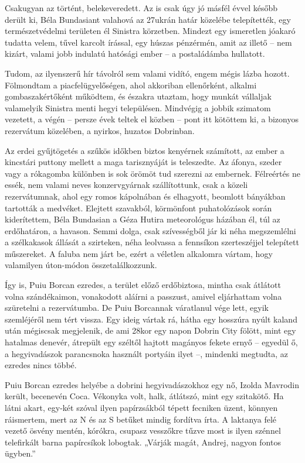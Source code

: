 \documentclass{IEEEtran}
\begin{document}
Csakugyan az történt, belekeveredett. Az is csak úgy jó másfél évvel később
derült ki, Béla Bundasiant valahová az 27ukrán határ közelébe telepítették,
egy természetvédelmi területen él Sinistra körzetben. Mindezt egy ismeretlen
jóakaró tudatta velem, tűvel karcolt írással, egy húszas pénzérmén, amit az
illető – nem kizárt, valami jobb indulatú hatósági ember – a postaládámba
hullatott.

Tudom, az ilyenszerű hír távolról sem valami vidító, engem mégis lázba hozott.
Fölmondtam a piacfelügyelőségen, ahol akkoriban ellenőrként, alkalmi
gombaszakértőként működtem, és északra utaztam, hogy munkát vállaljak
valamelyik Sinistra menti hegyi településen. Mindvégig a jobbik szimatom
vezetett, a végén – persze évek teltek el közben – pont itt kötöttem ki, a
bizonyos rezervátum közelében, a nyirkos, huzatos Dobrinban.

Az erdei gyűjtögetés a szűkös időkben biztos kenyérnek számított, az ember a
kincstári puttony mellett a maga tarisznyáját is teleszedte. Az áfonya, szeder
vagy a rókagomba különben is sok örömöt tud szerezni az embernek. Félreértés
ne essék, nem valami neves konzervgyárnak szállítottunk, csak a közeli
rezervátumnak, ahol egy romos kápolnában és elhagyott, beomlott bányákban
tartották a medvéket. Elejtett szavakból, körmönfont puhatolózások során
kiderítettem, Béla Bundasian a Géza Hutira meteorológus házában él, túl az
erdőhatáron, a havason. Semmi dolga, csak szívességből jár ki néha
megszemlélni a szélkakasok állását a szirteken, néha leolvassa a fennsíkon
szerteszéjjel telepített műszereket. A faluba nem járt be, ezért a véletlen
alkalomra vártam, hogy valamilyen úton-módon összetalálkozzunk.

Így is, Puiu Borcan ezredes, a terület előző erdőbiztosa, mintha csak átlátott
volna szándékaimon, vonakodott aláírni a passzust, amivel eljárhattam volna
szüretelni a rezervátumba. De Puiu Borcannak váratlanul vége lett, egyik
szemléjéről nem tért vissza. Egy ideig vártak rá, hátha egy hosszúra nyúlt
kaland után mégiscsak megjelenik, de ami 28kor egy napon Dobrin City fölött,
mint egy hatalmas denevér, átrepült egy széltől hajtott magányos fekete ernyő
– egyedül ő, a hegyivadászok parancsnoka használt portyáin ilyet –, mindenki
megtudta, az ezredes nincs többé.

Puiu Borcan ezredes helyébe a dobrini hegyivadászokhoz egy nő, Izolda Mavrodin
került, becenevén Coca. Vékonyka volt, halk, átlátszó, mint egy szitakötő. Ha
látni akart, egy-két szóval ilyen papírzsákból tépett fecniken üzent, könnyen
ráismertem, mert az N és az S betűket mindig fordítva írta. A laktanya felé
vezető ösvény mentén, kórókra, csupasz vesszőkre tűzve most is ilyen szénnel
telefirkált barna papírcsíkok lobogtak. „Várják magát, Andrej, nagyon fontos
ügyben.”
\end{document}
